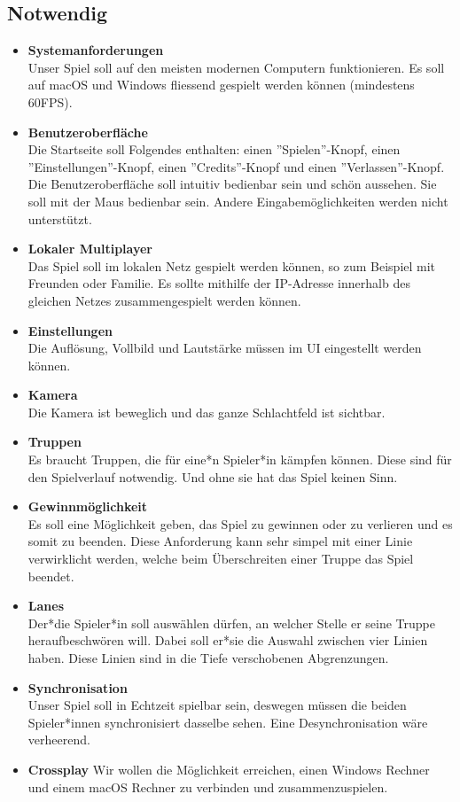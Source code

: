 \subsection{Notwendig}
\begin{itemize}
    \item \textbf{Systemanforderungen} \\
        Unser Spiel soll auf den meisten modernen Computern funktionieren. Es soll auf macOS und
        Windows fliessend gespielt werden können (mindestens 60\gls{FPS}).
    \item \textbf{Benutzeroberfläche} \\
        Die Startseite soll Folgendes enthalten: einen ''Spielen''-Knopf, einen ''Einstellungen''-Knopf, einen
        ''Credits''-Knopf und einen ''Verlassen''-Knopf. Die Benutzeroberfläche soll intuitiv bedienbar sein und
        schön aussehen. Sie soll mit der Maus bedienbar sein. Andere Eingabemöglichkeiten
        werden nicht unterstützt.
    \item \textbf{\gls{Lokal}er Multiplayer} \\
        Das Spiel soll im lokalen Netz gespielt werden können, so zum Beispiel mit Freunden oder Familie.
        Es sollte mithilfe der IP-Adresse innerhalb des gleichen Netzes zusammengespielt werden können.
    \item \textbf{Einstellungen} \\
        Die Auflösung, Vollbild und Lautstärke müssen im UI eingestellt werden können.
    \item \textbf{\gls{Kamera}} \\
        Die Kamera ist beweglich und das ganze Schlachtfeld ist sichtbar.
    \item \textbf{Truppen} \\
        Es braucht Truppen, die für eine*n Spieler*in kämpfen können. Diese sind für den Spielverlauf notwendig.
        Und ohne sie hat das Spiel keinen Sinn.
    \item \textbf{Gewinnmöglichkeit} \\
        Es soll eine Möglichkeit geben, das Spiel zu gewinnen oder zu verlieren und es somit zu beenden. Diese Anforderung kann sehr simpel
        mit einer Linie verwirklicht werden, welche beim Überschreiten einer Truppe das Spiel beendet.
    \item \textbf{\glspl{Lane}} \\
        Der*die Spieler*in soll auswählen dürfen, an welcher Stelle er seine Truppe heraufbeschwören will. Dabei soll er*sie die Auswahl zwischen vier Linien haben. Diese Linien sind in die Tiefe verschobenen Abgrenzungen.
    \item \textbf{Synchronisation} \\
        Unser Spiel soll in Echtzeit spielbar sein, deswegen müssen die beiden Spieler*innen synchronisiert dasselbe sehen. Eine Desynchronisation wäre verheerend. 
    \item \textbf{\gls{Crossplay}}
        Wir wollen die Möglichkeit erreichen, einen Windows Rechner und einem macOS Rechner zu verbinden und zusammenzuspielen.
\end{itemize}

